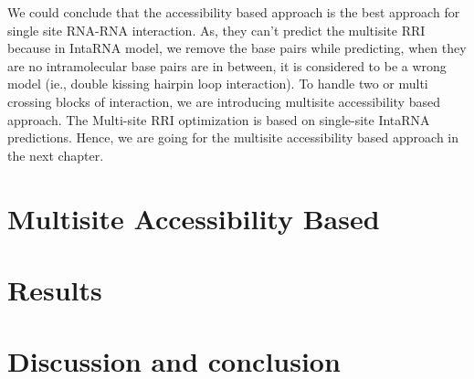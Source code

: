 \documentclass[twoside,a4paper]{report}
\begin{document}
	We could conclude that the accessibility based approach is the best approach for single site RNA-RNA interaction. As, they can't predict the multisite RRI because in IntaRNA model, we remove the base pairs while predicting, when they are no intramolecular base pairs are in between, it is considered to be a wrong model (ie., double kissing hairpin loop interaction).  To handle two or multi crossing blocks of interaction, we are introducing multisite accessibility based approach. The Multi-site RRI optimization is based on single-site IntaRNA predictions. Hence, we are going for the multisite accessibility based approach in the next chapter.\\

		
		
		
	\chapter{Multisite Accessibility Based  }
	\chapter{Results}
	\chapter{Discussion and conclusion}
	
	
	
	

	
\end{document}
